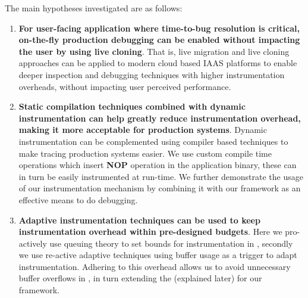 \iffalse
The main hypotheses investigated are as follows:
\begin{enumerate}
	
	\item \textbf{For user-facing application where time-to-bug resolution is critical, on-the-fly production debugging can be enabled without impacting the user by using live cloning}.
	That is, live migration and live cloning approaches can be applied to modern cloud based IAAS platforms to enable deeper inspection and debugging techniques with higher instrumentation overheads, without impacting user perceived performance.
	
	\item \textbf{Static compilation techniques combined with dynamic instrumentation can help greatly reduce instrumentation overhead, making it more acceptable for production systems}.
	Dynamic instrumentation can be complemented using compiler based techniques to make tracing production systems easier.
	We use custom compile time operations which insert \textbf{NOP} operation in the application binary, these can in turn be easily instrumented at run-time. 
	We further demonstrate the usage of our instrumentation mechanism by combining it with our \livedebugging framework as an effective means to do debugging.
	
	\item \textbf{Adaptive instrumentation techniques can be used to keep instrumentation overhead within pre-designed budgets}. 
	Here we pro-actively use queuing theory to set bounds for instrumentation in \parikshan, secondly we use re-active adaptive techniques using buffer usage as a trigger to adapt instrumentation.
	Adhering to this overhead allows us to avoid unnecessary buffer overflows in \parikshan, in turn extending the \debugwindow(explained later) for our framework.
	
	
\end{enumerate}


